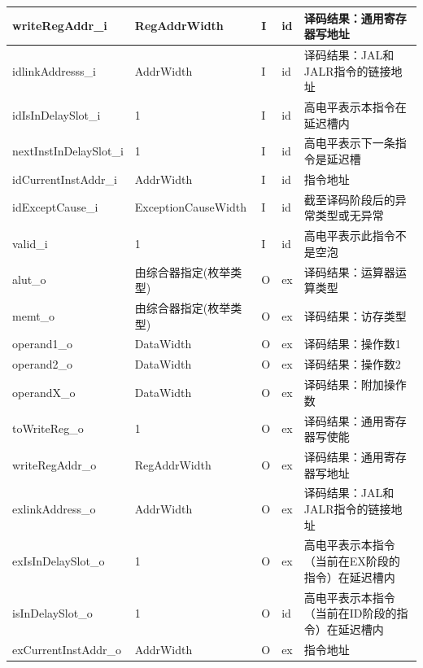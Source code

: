 \documentclass{article}
\begin{document}
\begin{spacing}{1.4}
\begin{table}[!htb]
\begin{center}
\begin{tabular*}{17cm}{l|l|l|l|p{5cm}}
\hline writeRegAddr\_i         & RegAddrWidth           & I     & id            & 译码结果：通用寄存器写地址 \\
\hline idlinkAddresss\_i       & AddrWidth              & I     & id            & 译码结果：JAL和JALR指令的链接地址 \\
\hline idIsInDelaySlot\_i      & 1                      & I     & id            & 高电平表示本指令在延迟槽内 \\
\hline nextInstInDelaySlot\_i  & 1                      & I     & id            & 高电平表示下一条指令是延迟槽 \\
\hline idCurrentInstAddr\_i    & AddrWidth              & I     & id            & 指令地址 \\
\hline idExceptCause\_i        & ExceptionCauseWidth    & I     & id            & 截至译码阶段后的异常类型或无异常 \\
\hline valid\_i                & 1                      & I     & id            & 高电平表示此指令不是空泡 \\
\hline alut\_o                 & 由综合器指定(枚举类型) & O     & ex            & 译码结果：运算器运算类型 \\
\hline memt\_o                 & 由综合器指定(枚举类型) & O     & ex            & 译码结果：访存类型 \\
\hline operand1\_o             & DataWidth              & O     & ex            & 译码结果：操作数1 \\
\hline operand2\_o             & DataWidth              & O     & ex            & 译码结果：操作数2 \\
\hline operandX\_o             & DataWidth              & O     & ex            & 译码结果：附加操作数 \\
\hline toWriteReg\_o           & 1                      & O     & ex            & 译码结果：通用寄存器写使能 \\
\hline writeRegAddr\_o         & RegAddrWidth           & O     & ex            & 译码结果：通用寄存器写地址 \\
\hline exlinkAddress\_o        & AddrWidth              & O     & ex            & 译码结果：JAL和JALR指令的链接地址 \\
\hline exIsInDelaySlot\_o      & 1                      & O     & ex            & 高电平表示本指令（当前在EX阶段的指令）在延迟槽内 \\
\hline isInDelaySlot\_o        & 1                      & O     & id            & 高电平表示本指令（当前在ID阶段的指令）在延迟槽内 \\
\hline exCurrentInstAddr\_o    & AddrWidth              & O     & ex            & 指令地址 \\

\end{tabular*}
\end{center}
\end{table}
\end{spacing}
\end{document}
